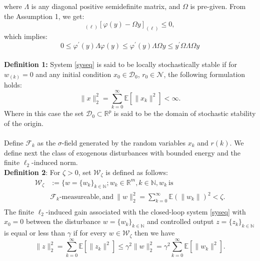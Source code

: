\documentclass[conference]{IEEEtran}
\begin{document}
where $\varLambda$ is any diagonal positive semidefinite matrix, and $\varOmega$ is pre-given. From the Assumption 1, we get:
\begin{equation}
[\varOmega y]_{(\ell)}[\varphi(y)-\varOmega y]_{(\ell)}\leq0,
\end{equation}
which implies:
\begin{equation}
 0\leq\varphi^{\mathrm{'}}(y)\varLambda\varphi(y) \leq \varphi^{\mathrm{'}}(y)\varLambda\varOmega y \leq y^{\mathrm{'}}\varOmega\varLambda\varOmega y
\end{equation}\\
\textbf{Definition 1:} System \eqref{syseq} is said to be locally stochastically stable if for $w_(k)=0$ and any initial condition $x_0\in \mathcal{D}_0$, $r_0\in \mathcal{N}$, the following formulation holds:
\begin{equation}
	\|x\|^2_2=\sum_{k=0}^{\infty}\mathbb{E}[\|x_k\|^2]<\infty.
\end{equation} 
Where in this case the set $\mathcal{D}_0 \subset \mathbb{R}^{p}$ is said to be the domain of stochastic stability of the origin. \\
\\
Define $\mathcal{F}_k$ as the $\sigma$-field generated by the random variables $x_k$ and $r(k)$. We define next the class of exogenous disturbances with bounded energy and the finite $\ell_2$-induced              norm.
\\
\textbf{Definition 2}: For $\zeta>0$, set $\mathcal{W}_{\zeta} $ is defined as follows:
\begin{equation}
	\begin{split}
		\mathcal{W}_{\zeta}&:=\{w=\{w_k\}_{k\in\mathbb{N}};w_k\in\mathbb{R}^{m}, k\in\mathbb{N}, w_k \ \text{is} \\
		&\mathcal{F}_k\text{-measureable}, \text{and}\  \|w\|^2_2=\sum_{k=0}^{\infty}\mathbb{E}(\|w_k\|)^2<\zeta.\\
	\end{split}
\end{equation}
The finite $\ell_2$-induced gain associated with the closed-loop system \eqref{syseq} with $x_0=0$ between the disturbance $w=\{w_k\}_{k\in\mathbb{N}}$ and controlled output $z=\{z_k\}_{k\in\mathbb{N}}$ is equal or less than $\gamma$ if for every $w\in\mathcal{W}_{\zeta}$ then we have
\begin{equation}
\|z\|^2_2=\sum_{k=0}^{\infty}\mathbb{E}\left[\|z_k\|^2\right] \leq \gamma^{2}\|w\|^2_2=\gamma^{2}\sum_{k=0}^{\infty}\mathbb{E}\left[\|w_k\|^2\right].
\end{equation}
\end{document}
